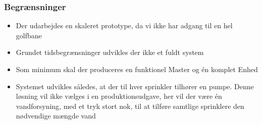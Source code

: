 \subsubsection*{Begrænsninger}
\begin{itemize}
\item Der udarbejdes en skaleret prototype, da vi ikke har adgang til en hel golfbane
\item Grundet tidsbegrænsninger udvikles der ikke et fuldt system 
\item Som minimum skal der produceres en funktionel Master og én komplet Enhed
\item Systemet udvikles således, at der til hver sprinkler tilhører en pumpe. Denne løsning vil ikke vælges i en produktionsudgave, her vil der være én vandforsyning, med et tryk stort nok, til at tilføre samtlige sprinklere den nødvendige mængde vand
\end{itemize}



